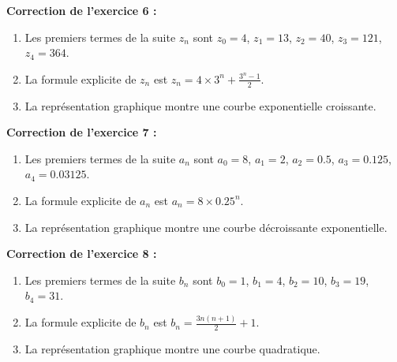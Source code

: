 \documentclass[12pt,a4paper,french]{book}
\begin{document}
\begin{corrige}
\textbf{Correction de l'exercice 6 :}
\begin{enumerate}
    \item Les premiers termes de la suite $z_n$ sont $z_0 = 4$, $z_1 = 13$, $z_2 = 40$, $z_3 = 121$, $z_4 = 364$.
    \item La formule explicite de $z_n$ est $z_n = 4 \times 3^n + \frac{3^n - 1}{2}$.
    \item La représentation graphique montre une courbe exponentielle croissante.
\end{enumerate}
\end{corrige}

\begin{corrige}
\textbf{Correction de l'exercice 7 :}
\begin{enumerate}
    \item Les premiers termes de la suite $a_n$ sont $a_0 = 8$, $a_1 = 2$, $a_2 = 0.5$, $a_3 = 0.125$, $a_4 = 0.03125$.
    \item La formule explicite de $a_n$ est $a_n = 8 \times 0.25^n$.
    \item La représentation graphique montre une courbe décroissante exponentielle.
\end{enumerate}
\end{corrige}

\begin{corrige}
\textbf{Correction de l'exercice 8 :}
\begin{enumerate}
    \item Les premiers termes de la suite $b_n$ sont $b_0 = 1$, $b_1 = 4$, $b_2 = 10$, $b_3 = 19$, $b_4 = 31$.
    \item La formule explicite de $b_n$ est $b_n = \frac{3n(n+1)}{2} + 1$.
    \item La représentation graphique montre une courbe quadratique.
\end{enumerate}
\end{corrige}
\end{document}
